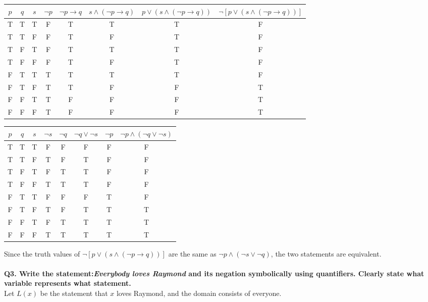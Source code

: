 \documentclass[letterpaper,12pt]{article}
\begin{document}
\begin{center}
    \begin{tabular}{|c|c|c|c|c|c|c|c|}
        \hline
        $p$&$q$&$s$&$\neg p$&$\neg p \rightarrow q$&$s \wedge \left(\neg p \rightarrow q\right)$&$p \vee \left(s \wedge \left(\neg p \rightarrow q\right)\right)$&$\neg [p \vee \left(s \wedge \left(\neg p \rightarrow q\right)\right)]$\\ \hline
        T&T&T&F&T&T&T&F\\\hline
        T&T&F&F&T&F&T&F\\\hline
        T&F&T&F&T&T&T&F\\\hline
        T&F&F&F&T&F&T&F\\\hline
        F&T&T&T&T&T&T&F\\\hline
        F&T&F&T&T&F&F&T\\\hline
        F&F&T&T&F&F&F&T\\\hline
        F&F&F&T&F&F&F&T\\\hline
    \end{tabular}
\end{center}
\begin{center}
    \begin{tabular}{|c|c|c|c|c|c|c|c|}
        \hline
        $p$&$q$&$s$&$\neg s$&$\neg q$&$\neg q \vee \neg s$&$\neg p$&$\neg p \wedge \left(\neg q \vee \neg s\right)$\\ \hline
        T&T&T&F&F&F&F&F\\\hline
        T&T&F&T&F&T&F&F\\\hline
        T&F&T&F&T&T&F&F\\\hline
        T&F&F&T&T&T&F&F\\\hline
        F&T&T&F&F&F&T&F\\\hline
        F&T&F&T&F&T&T&T\\\hline
        F&F&T&F&T&T&T&T\\\hline
        F&F&F&T&T&T&T&T\\\hline
    \end{tabular}
\end{center}
Since the truth values of $\neg [p \lor (s \land (\neg p \rightarrow q))]$ are the same as $\neg p \land (\neg s \lor \neg q)$, the two statements are equivalent. \\
\\
\textbf{Q3. Write the statement:\textit{Everybody loves Raymond} and its negation symbolically using quantifiers. Clearly state what variable represents what statement.} \\
Let $L(x)$ be the statement that $x$ loves Raymond, and the domain consists of everyone. \\
\end{document}
